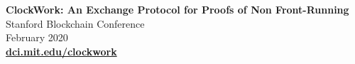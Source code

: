 
\textbf{ClockWork: An Exchange Protocol for Proofs of Non Front-Running} \\
Stanford Blockchain Conference \\
February 2020 \\
\href{https://dci.mit.edu/clockwork}{\textbf{dci.mit.edu/clockwork}}

